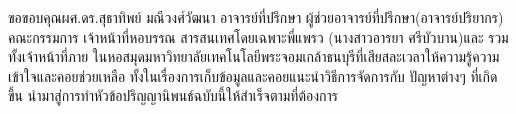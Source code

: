 \documentclass[12pt,oneside,openright,a4paper]{cpe-thai-project}
\begin{document}
\preface
ขอขอบคุณผศ.ดร.สุธาทิพย์ มณีวงศ์วัฒนา อาจารย์ที่ปรึกษา ผู้ช่วยอาจารย์ที่ปรึกษา(อาจารย์ปริยากร) คณะกรรมการ  เจ้าหน้าที่หอบรรณ
สารสนเทศโดยเฉพาะพี่แพรว (นางสาวอารยา ศรีบัวบาน)และ รวมทั้งเจ้าหน้าที่ภาย
ในหอสมุดมหาวิทยาลัยเทคโนโลยีพระจอมเกล้าธนบุรีที่เสียสละเวลาให้ความรู้ความเข้าใจและคอยช่วยเหลือ ทั้งในเรื่องการเก็บข้อมูลและคอยแนะนำวิธีการจัดการกับ
ปัญหาต่างๆ ที่เกิดขึ้น นำมาสู่การทำหัวข้อปริญญานิพนธ์ฉบับนี้ให้สำเร็จตามที่ต้องการ 

\tableofcontents                    
\listoftables
\listoffigures                      

\end{document}
